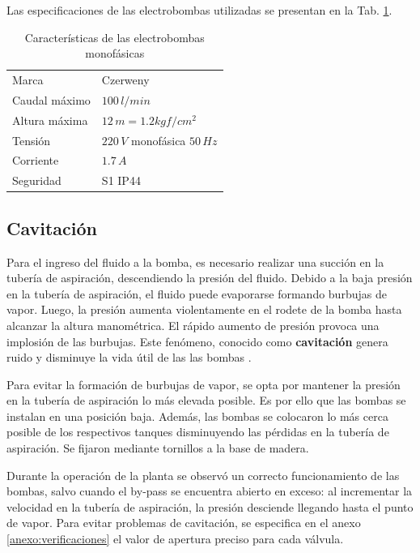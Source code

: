 Las especificaciones de las electrobombas utilizadas se presentan en la Tab.
\ref{tab:caractBombas}.

\begin{table}[ht]
\renewcommand{\arraystretch}{1.3}
\centering
\begin{tabular}{|l|l|}
\hline
Marca & Czerweny\\
Caudal máximo &  $100\,l/min$\\
Altura máxima &  $12\,m = 1.2 kgf/cm^2$\\
Tensión & $220\,V$ monofásica $50\,Hz$\\
Corriente & $1.7\,A$\\
Seguridad & S1 IP44\\
\hline
\end{tabular}
\caption{Características de las electrobombas monofásicas}
\label{tab:caractBombas}
\end{table}

\subsection{Cavitación}
\label{subsec:cavitacion}
Para el ingreso del fluido a la bomba, es necesario realizar una succión
en la tubería de aspiración, descendiendo la presión del fluido.
Debido a la baja presión en la tubería de aspiración, el fluido puede
evaporarse formando burbujas de vapor.
Luego, la presión aumenta violentamente en el rodete de la bomba hasta alcanzar
la altura manométrica.
El rápido aumento de presión provoca una implosión de las burbujas.
Este fenómeno, conocido como \textbf{cavitación} genera ruido y disminuye la
vida útil de las las bombas \cite{bib:ApuntesMDFBombas}.

Para evitar la formación de burbujas de vapor, se opta por mantener la presión
en la tubería de aspiración lo más elevada posible.
Es por ello que las bombas se instalan en una posición baja.
Además, las bombas se colocaron lo más cerca posible de los respectivos
tanques disminuyendo las pérdidas en la tubería de aspiración.
Se fijaron mediante tornillos a la base de madera.

Durante la operación de la planta se observó un correcto funcionamiento de las
bombas, salvo cuando el by-pass se encuentra abierto en exceso: al
incrementar la
velocidad en la tubería de aspiración, la presión desciende llegando hasta el
punto de vapor.
Para evitar problemas de cavitación, se especifica en el anexo
\ref{anexo:verificaciones} el valor de apertura preciso para cada válvula.

